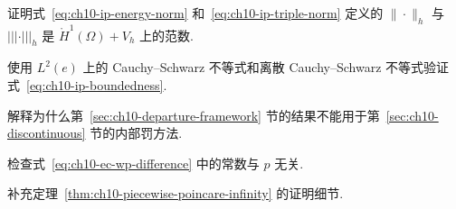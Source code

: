 \begin{MBExercise}
\label{exr:ch10-31}
证明式~\eqref{eq:ch10-ip-energy-norm} 和~\eqref{eq:ch10-ip-triple-norm} 定义的 $\|\cdot\|_h$ 与 $|||\cdot|||_h$ 是 $\mathring H^1(\Omega)+V_h$ 上的范数.
\end{MBExercise}

\begin{MBExercise}
\label{exr:ch10-32}
使用 $L^2(e)$ 上的 Cauchy--Schwarz 不等式和离散 Cauchy--Schwarz 不等式验证式~\eqref{eq:ch10-ip-boundedness}.
\end{MBExercise}

\begin{MBExercise}
\label{exr:ch10-33}
解释为什么第~\ref{sec:ch10-departure-framework} 节的结果不能用于第~\ref{sec:ch10-discontinuous} 节的内部罚方法.
\end{MBExercise}

\begin{MBExercise}
\label{exr:ch10-34}
检查式~\eqref{eq:ch10-ec-wp-difference} 中的常数与 $p$ 无关.
\end{MBExercise}

\setcounter{exerciseitem}{35}
\begin{MBExercise}
\label{exr:ch10-36}
补充定理~\ref{thm:ch10-piecewise-poincare-infinity} 的证明细节.
\end{MBExercise}
